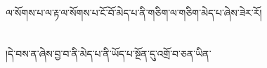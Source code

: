 ལ་སོགས་པ་ལ་རྟ་ལ་སོགས་པ་ངོ་བོ་མེད་པ་ནི་གཅིག་ལ་གཅིག་མེད་པ་ཞེས་ཟེར་རོ།\chapter{ }།དེ་བས་ན་ཞེས་བྱ་བ་ནི་མེད་པ་ནི་ཡོད་པ་སྔོན་དུ་འགྲོ་བ་ཅན་ཡིན་